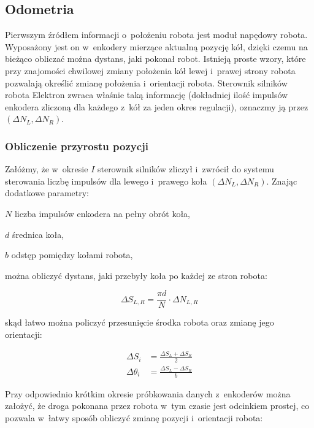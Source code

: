 \subsection{Odometria}

Pierwszym źródłem informacji o~położeniu robota jest moduł napędowy robota.
Wyposażony jest on w~enkodery mierzące aktualną pozycję kół, dzięki czemu na
bieżąco obliczać można dystans, jaki pokonał robot. Istnieją proste wzory, które
przy znajomości chwilowej zmiany położenia kół lewej i~prawej strony robota
pozwalają określić zmianę położenia i~orientacji robota. Sterownik silników
robota Elektron zwraca właśnie taką informację (dokładniej ilość impulsów
enkodera zliczoną dla każdego z~kół za jeden okres regulacji), oznaczmy ją przez
$(\Delta N_L, \Delta N_R)$.

\subsubsection{Obliczenie przyrostu pozycji}

Załóżmy, że w~okresie $I$ sterownik silników zliczył i~zwrócił do systemu
sterowania liczbę impulsów dla lewego i~prawego koła $(\Delta N_L, \Delta N_R)$.
Znając dodatkowe parametry:


\begin{mydescription}{5pt}
\item[$N$] liczba impulsów enkodera na pełny obrót koła,
\item[$d$] średnica koła,
\item[$b$] odstęp pomiędzy kołami robota,
\end{mydescription}

można obliczyć dystans, jaki przebyły koła po każdej ze stron robota:

\[
\Delta S_{L,R} = \frac{\pi d}{N} \cdot \Delta N_{L,R}
\]

skąd łatwo można policzyć przesunięcie środka robota oraz zmianę jego
orientacji:

\begin{align*}
\Delta S_i &= \frac{\Delta S_L + \Delta S_R}{2} \\
\Delta \theta_i &= \frac{\Delta S_L - \Delta S_R}{b}
\end{align*}

Przy odpowiednio krótkim okresie próbkowania danych z~enkoderów można założyć,
że droga pokonana przez robota w~tym czasie jest odcinkiem prostej, co pozwala
w~łatwy sposób obliczyć zmianę pozycji i~orientacji robota:

